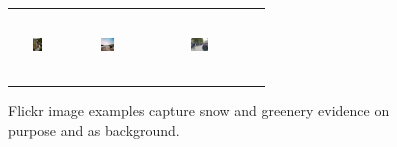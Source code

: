 \documentclass[10pt]{article}
\begin{document}
\begin{figure}[th]
{{\begin{center}
\begin{tabular}{@{}c@{\,\,\,}c@{\,\,\,}c@{\,\,\,}c@{\,\,\,}}
\includegraphics[width=0.19\textwidth, height=0.7in]{image/waterfallgreen.jpg} &
\includegraphics[width=0.19\textwidth, height=0.7in]{image/dogtree.jpg} &
\includegraphics[width=0.19\textwidth, height=0.7in]{image/humantree.jpg} \\
\end{tabular}
\end{center}
}}
\caption{Flickr image examples capture snow and greenery evidence on purpose and as background.}
\label{fig:flickrexp}
\end{figure}
\end{document}
